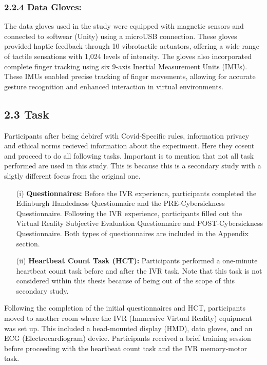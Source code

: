 \documentclass[12pt,oneside,openright]{report}
\begin{document}
\subsubsection*{2.2.4 Data Gloves:}
The data gloves used in the study were equipped with magnetic sensors and connected to softwear (Unity) using a microUSB connection. These gloves provided haptic feedback through 10 vibrotactile actuators, offering a wide range of tactile sensations with 1,024 levels of intensity. The gloves also incorporated complete finger tracking using six 9-axis Inertial Measurement Units (IMUs). These IMUs enabled precise tracking of finger movements, allowing for accurate gesture recognition and enhanced interaction in virtual environments.


\subsection*{2.3 Task}

Participants after being debiref with Covid-Specific rules, information privacy and ethical norms recieved information about the experiment. Here they cosent and proceed to do all following tasks. Important is to mention that not all task performed are used in this study. This is because this is a secondary study with a sligtly different focus from the original one. 

\begin{enumerate}
\item[(i)] \textbf{Questionnaires:} Before the IVR experience, participants completed the Edinburgh Handedness Questionnaire and the PRE-Cybersickness Questionnaire. Following the IVR experience, participants filled out the Virtual Reality Subjective Evaluation Questionnaire and POST-Cybersickness Questionnaire. Both types of questionnaires are included in the Appendix section.

\item[(ii)] \textbf{Heartbeat Count Task (HCT):} Participants performed a one-minute heartbeat count task before and after the IVR task. Note that this task is not considered within this thesis because of being out of the scope of this secondary study.
\end{enumerate}

Following the completion of the initial questionnaires and HCT, participants moved to another room where the IVR (Immersive Virtual Reality) equipment was set up. This included a head-mounted display (HMD), data gloves, and an ECG (Electrocardiogram) device. Participants received a brief training session before proceeding with the heartbeat count task and the IVR memory-motor task.
\end{document}
